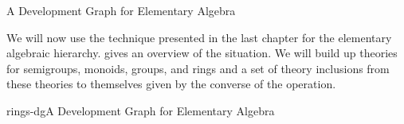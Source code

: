 
\begin{omgroup}[id=dg-elal]{A Development Graph for Elementary Algebra}

  We will now use the technique presented in the last chapter for the elementary algebraic
  hierarchy. {} gives an overview of the situation. We will build up
  theories for semigroups, monoids, groups, and rings and a set of theory inclusions from
  these theories to themselves given by the converse of the operation.

\begin{myfig}{rings-dg}{A Development Graph for Elementary Algebra}
\end{myfig}
\end{omgroup}
